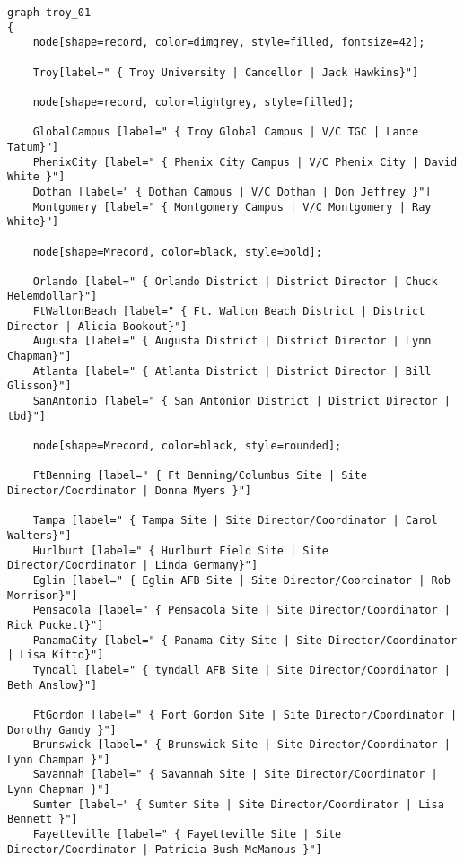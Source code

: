 \documentclass{article}
\begin{document}
\lstset{language=Lisp,numbers=left,keepspaces=false,basicstyle=\small,numberstyle=\tiny,breaklines=true,showstringspaces=false}
\begin{lstlisting}
graph troy_01 
{
    node[shape=record, color=dimgrey, style=filled, fontsize=42];

    Troy[label=" { Troy University | Cancellor | Jack Hawkins}"]

    node[shape=record, color=lightgrey, style=filled];

    GlobalCampus [label=" { Troy Global Campus | V/C TGC | Lance Tatum}"]
    PhenixCity [label=" { Phenix City Campus | V/C Phenix City | David White }"]
    Dothan [label=" { Dothan Campus | V/C Dothan | Don Jeffrey }"]
    Montgomery [label=" { Montgomery Campus | V/C Montgomery | Ray White}"]

    node[shape=Mrecord, color=black, style=bold];

    Orlando [label=" { Orlando District | District Director | Chuck Helemdollar}"]
    FtWaltonBeach [label=" { Ft. Walton Beach District | District Director | Alicia Bookout}"]
    Augusta [label=" { Augusta District | District Director | Lynn Chapman}"]
    Atlanta [label=" { Atlanta District | District Director | Bill Glisson}"]
    SanAntonio [label=" { San Antonion District | District Director | tbd}"]

    node[shape=Mrecord, color=black, style=rounded];

    FtBenning [label=" { Ft Benning/Columbus Site | Site Director/Coordinator | Donna Myers }"]

    Tampa [label=" { Tampa Site | Site Director/Coordinator | Carol Walters}"]
    Hurlburt [label=" { Hurlburt Field Site | Site Director/Coordinator | Linda Germany}"]
    Eglin [label=" { Eglin AFB Site | Site Director/Coordinator | Rob Morrison}"]
    Pensacola [label=" { Pensacola Site | Site Director/Coordinator | Rick Puckett}"]
    PanamaCity [label=" { Panama City Site | Site Director/Coordinator | Lisa Kitto}"]
    Tyndall [label=" { tyndall AFB Site | Site Director/Coordinator | Beth Anslow}"]

    FtGordon [label=" { Fort Gordon Site | Site Director/Coordinator | Dorothy Gandy }"]
    Brunswick [label=" { Brunswick Site | Site Director/Coordinator | Lynn Champan }"]
    Savannah [label=" { Savannah Site | Site Director/Coordinator | Lynn Chapman }"]
    Sumter [label=" { Sumter Site | Site Director/Coordinator | Lisa Bennett }"]
    Fayetteville [label=" { Fayetteville Site | Site Director/Coordinator | Patricia Bush-McManous }"]


\end{lstlisting}
\end{document}

